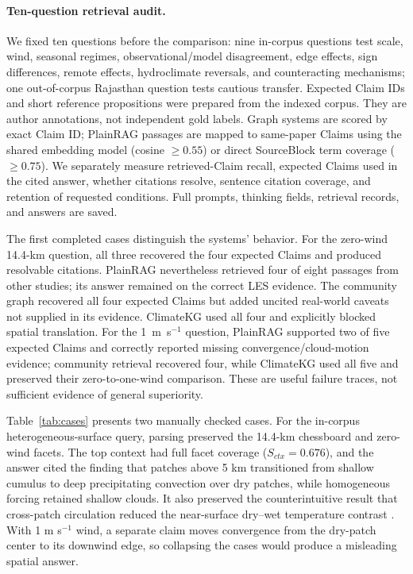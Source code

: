 \documentclass{article}
\newcommand{\system}{ClimateKG}
\begin{document}
\paragraph{Ten-question retrieval audit.}
We fixed ten questions before the comparison: nine in-corpus questions test scale, wind, seasonal regimes, observational/model disagreement, edge effects, sign differences, remote effects, hydroclimate reversals, and counteracting mechanisms; one out-of-corpus Rajasthan question tests cautious transfer. Expected Claim IDs and short reference propositions were prepared from the indexed corpus. They are author annotations, not independent gold labels. Graph systems are scored by exact Claim ID; PlainRAG passages are mapped to same-paper Claims using the shared embedding model (cosine $\geq0.55$) or direct SourceBlock term coverage ($\geq0.75$). We separately measure retrieved-Claim recall, expected Claims used in the cited answer, whether citations resolve, sentence citation coverage, and retention of requested conditions. Full prompts, thinking fields, retrieval records, and answers are saved.

The first completed cases distinguish the systems' behavior. For the zero-wind 14.4-km question, all three recovered the four expected Claims and produced resolvable citations. PlainRAG nevertheless retrieved four of eight passages from other studies; its answer remained on the correct LES evidence. The community graph recovered all four expected Claims but added uncited real-world caveats not supplied in its evidence. \system{} used all four and explicitly blocked spatial translation. For the 1~m~s$^{-1}$ question, PlainRAG supported two of five expected Claims and correctly reported missing convergence/cloud-motion evidence; community retrieval recovered four, while \system{} used all five and preserved their zero-to-one-wind comparison. These are useful failure traces, not sufficient evidence of general superiority.

Table~\ref{tab:cases} presents two manually checked cases. For the in-corpus heterogeneous-surface query, parsing preserved the 14.4-km chessboard and zero-wind facets. The top context had full facet coverage ($S_{ctx}=0.676$), and the answer cited the finding that patches above 5 km transitioned from shallow cumulus to deep precipitating convection over dry patches, while homogeneous forcing retained shallow clouds. It also preserved the counterintuitive result that cross-patch circulation reduced the near-surface dry--wet temperature contrast \citep{lee2019}. With 1 m s$^{-1}$ wind, a separate claim moves convergence from the dry-patch center to its downwind edge, so collapsing the cases would produce a misleading spatial answer.
\end{document}
